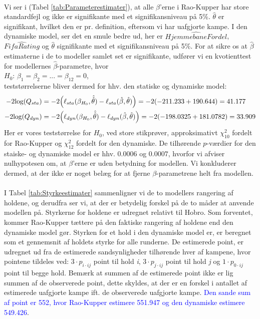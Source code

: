 \documentclass[11pt,a4paper]{article}
\begin{document}
\\Vi ser i (Tabel \ref{tab:Parameterestimater}), at alle $\beta$'erne i Rao-Kupper har store standardfejl og ikke er signifikante med et signifikansniveau på 5\%. $\hat{\theta}$ er signifikant, hvilket den er pr. definition, eftersom vi har uafgjorte kampe. I den dynamiske model, ser det en smule bedre ud, her er $\hat{HjemmebaneFordel}$, $\hat{FifaRating}$ og $\hat{\theta}$ signifikante med et signifikansniveau på 5\%. For at sikre os at $\hat{\beta}$ estimaterne i de to modeller samlet set er signifikante, udfører vi en kvotienttest for modellernes $\hat{\beta}$-parametre, hvor  \\
$H_0$: $\beta_1=\beta_2=...=\beta_{12} = 0$,\\
teststørrelserne bliver dermed for hhv. den statiske og dynamiske model:\\
\begin{align*}
    -2\text{log}(Q_{sta})&=-2\Big{(}\ell_{sta} (\beta_{H_0}, \hat{\hat{\theta}})-\ell_{sta} (\hat{\beta},\hat{\theta})\Big{)}=-2(-211.233+190.644)=41.177\\
    -2\text{log}(Q_{dyn})&=-2\Big{(}\ell_{dyn} (\beta_{H_0},\hat{\hat{\theta}})-\ell_{dyn} (\hat{\beta},\hat{\theta})\Big{)}=-2(-198.0325+181.0782)=33.909
\end{align*}
Her er vores teststørrelse for $H_0$, ved store stikprøver, approksimativt $\chi^2_{10}$ fordelt for Rao-Kupper og $\chi^2_{12}$ fordelt for den dynamiske. De tilhørende $p$-værdier for den staiske- og dynamiske model er hhv. $0.0006$ og $0.0007$, hvorfor vi afviser nulhypotesen om, at $\beta$'erne er uden betydning for modellen. Vi konkluderer dermed, at der ikke er noget belæg for at fjerne $\beta$-parametrene helt fra modellen. 
\\\\I Tabel \ref{tab:Styrkeestimater} sammenligner vi de to modellers rangering af holdene, og derudfra ser vi, at der er betydelig forskel på de to måder at anvende modellen på. Styrkerne for holdene er udregnet relativt til Hobro. Som forventet, kommer Rao-Kupper tættere på den faktiske rangering af holdene end den dynamiske model gør. Styrken for et hold i den dynamiske model er, er beregnet som et gennemsnit af holdets styrke for alle runderne. De estimerede point, er udregnet ud fra de estimerede sandsynligheder tilhørende hver af kampene, hvor pointene tildeles ved: $3 \cdot p_{i \cdot ij}$ point til hold \textit{i}, $3\cdot p_{j \cdot ij}$ point til hold \textit{j} og $1\cdot p_{0 \cdot ij}$ point til begge hold. Bemærk at summen af de estimerede point ikke er lig summen af de observerede point, dette skyldes, at der er en forskel i antallet af estimerede uafgjorte kampe ift. de observerede uafgjorte kampe. \textcolor{blue}{Den sande sum af point er 552, hvor Rao-Kupper estimere 551.947 og den dynamiske estimere 549.426}.\\
\end{document}
